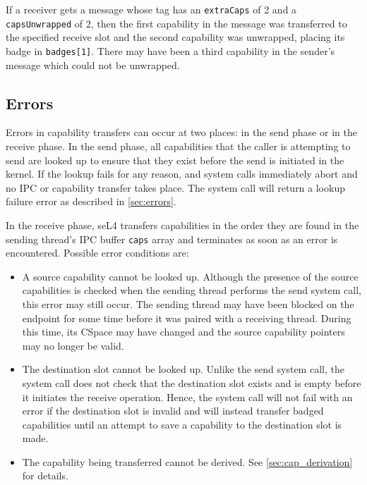 If a receiver gets a message whose tag has an \texttt{extraCaps} of 2 and a
\texttt{capsUnwrapped} of 2, then the first capability in the message was
transferred to the specified receive slot and the second capability was
unwrapped, placing its badge in \texttt{badges[1]}. There may have been a
third capability in the sender's message which could not be unwrapped.

\subsection{Errors}

Errors in capability transfers can occur at two places: in the send
phase or in the receive phase. In the send phase, all capabilities that
the caller is attempting to send are looked up to ensure that they exist
before the send is initiated in the kernel. If the lookup fails for any
reason,  and  system calls immediately abort and
no IPC or capability transfer takes place. The system call will return
a lookup failure error as described in \autoref{sec:errors}.

In the receive phase, seL4 transfers capabilities in the order they
are found in the sending thread's IPC buffer \texttt{caps} array
and terminates as soon as an error is encountered. Possible error
conditions are:

\begin{itemize}
    \item A source capability cannot be looked up. Although the presence
    of the source capabilities is checked when the sending thread
    performs the send system call, this error may still occur. The sending
    thread may have been blocked on the endpoint for some time before it
    was paired with a receiving thread. During this time, its
    CSpace may have changed and the source capability pointers may
    no longer be valid.

    \item The destination slot cannot be looked up. Unlike the send system call,
    the  system call does not check that the
    destination slot exists and is empty before it initiates the receive
    operation. Hence, the  system call will not
    fail with an error if the destination slot is invalid and will instead
    transfer badged capabilities until an attempt to save a capability to the
    destination slot is made.

    \item The capability being transferred cannot be derived. See
    \autoref{sec:cap_derivation} for details.
\end{itemize}

